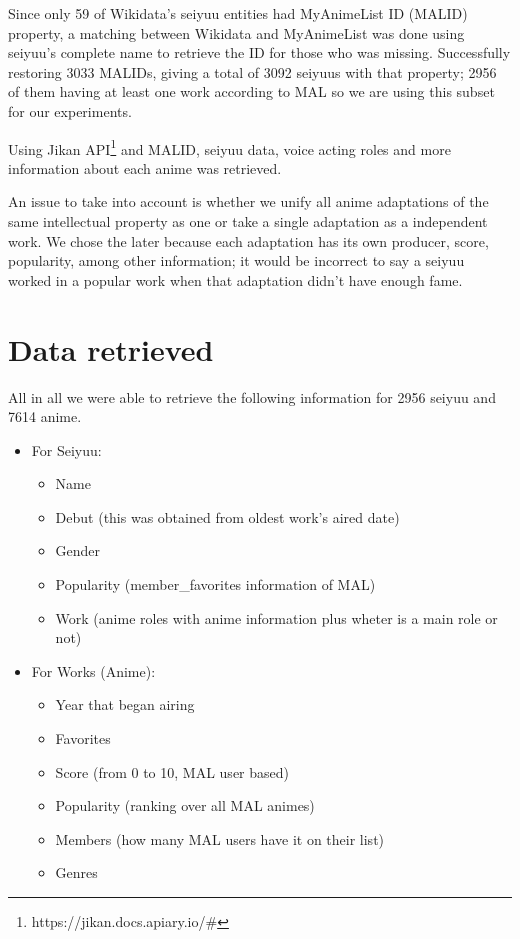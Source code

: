 Since only 59 of Wikidata's seiyuu entities had MyAnimeList ID (MALID) property, a matching between Wikidata and MyAnimeList was done using seiyuu's complete name to retrieve the ID for those who was missing. Successfully restoring 3033 MALIDs, giving a total of 3092 seiyuus with that property; 2956 of them having at least one work according to MAL so we are using this subset for our experiments.

Using Jikan API\footnote{https://jikan.docs.apiary.io/\#} and MALID, seiyuu data, voice acting roles and more information about each anime was retrieved. 

An issue to take into account is whether we unify all anime adaptations of the same intellectual property as one or take a single adaptation as a independent work. We chose the later because each adaptation has its own producer, score, popularity, among other information; it would be incorrect to say a seiyuu worked in a popular work when that adaptation didn't have enough fame.\\

\section{Data retrieved}
All in all we were able to retrieve the following information for 2956 seiyuu and 7614 anime.

\begin{itemize}
	\item For Seiyuu:
	\begin{itemize}
		\item Name
		\item Debut (this was obtained from oldest work's aired date)
		\item Gender
		\item Popularity (member\_favorites information of MAL)
		\item Work (anime roles with anime information plus wheter is a main role or not)
	\end{itemize}
	\item For Works (Anime):
	\begin{itemize}
		\item Year that began airing
		\item Favorites
		\item Score (from 0 to 10, MAL user based)
		\item Popularity (ranking over all MAL animes)
		\item Members (how many MAL users have it on their list)
		\item Genres
	\end{itemize}
\end{itemize}

